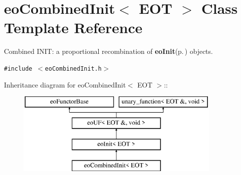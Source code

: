 \section{eo\-Combined\-Init$<$ EOT $>$ Class Template Reference}
\label{classeo_combined_init}
Combined INIT: a proportional recombination of {\bf eo\-Init}{\rm (p.\,\pageref{classeo_init})} objects.  


{\tt \#include $<$eo\-Combined\-Init.h$>$}

Inheritance diagram for eo\-Combined\-Init$<$ EOT $>$::\begin{figure}[H]
\begin{center}
\leavevmode
\includegraphics[height=4cm]{classeo_combined_init}
\end{center}
\end{figure}
